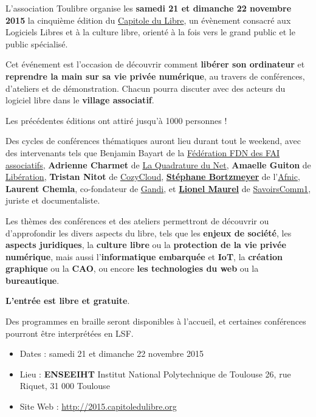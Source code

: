 
\Separateur

\par{\fontsize{12pt}{18pt}\selectfont
  L'association Toulibre organise les \textbf{samedi 21 et dimanche 22 novembre 2015} la cinquième
  édition du \href{http://capitoledulibre.org}{Capitole du Libre},
  un évènement consacré aux Logiciels Libres et à la culture libre,
  orienté à la fois vers le grand public et le public spécialisé.
}

\Separateur

Cet événement est l'occasion de découvrir comment \textbf{libérer son ordinateur}
et \textbf{reprendre la main sur sa vie privée numérique},
au travers de conférences, d'ateliers et de démonstration.
Chacun pourra discuter avec des acteurs du logiciel libre dans le \textbf{village associatif}.

Les précédentes éditions ont attiré jusqu'à 1000 personnes !

\Separateur

Des cycles de conférences thématiques auront lieu durant tout le weekend,
avec des intervenants tels que Benjamin Bayart de la \href{http://ffdn.org/}{Fédération FDN des FAI associatifs},
\textbf{Adrienne Charmet} de \href{http://laquadrature.net/}{La Quadrature du Net},
\textbf{Amaelle Guiton} de \href{http://www.liberation.fr/auteur/15260-amaelle-guiton}{Libération},
\textbf{Tristan Nitot} de \href{https://cozy.io/fr/}{CozyCloud},
\textbf{\href{http://www.bortzmeyer.org/}{Stéphane Bortzmeyer}} de l'\href{}{Afnic},
\textbf{Laurent Chemla}, co-fondateur de \href{http://gandi.net/}{Gandi},
et \textbf{\href{http://scinfolex.com/}{Lionel Maurel}} de \href{http://savoirscom1.info/}{SavoirsComm1}, juriste et documentaliste.

\Separateur

Les thèmes des conférences et des ateliers permettront de découvrir ou d'approfondir
les divers aspects du libre, tels que les \textbf{enjeux de société}, les \textbf{aspects juridiques},
la \textbf{culture libre} ou la \textbf{protection de la vie privée numérique},
mais aussi l'\textbf{informatique embarquée} et \textbf{IoT}, la \textbf{création graphique} ou la \textbf{CAO},
ou encore \textbf{les technologies du web} ou la \textbf{bureautique}.

\Separateur

\textbf{L'entrée est libre et gratuite}.

\Separateur

Des programmes en braille seront disponibles à l'accueil, et certaines conférences pourront être interprétées en LSF.

\begin{itemize}[label=$\bullet$]
\item Dates : samedi 21 et dimanche 22 novembre 2015
\item Lieu : \textbf{ENSEEIHT} Institut National Polytechnique de Toulouse
26, rue Riquet, 31 000 Toulouse
\item Site Web : \href{http://capitoledulibre.org}{http://2015.capitoledulibre.org}
\end{itemize}
